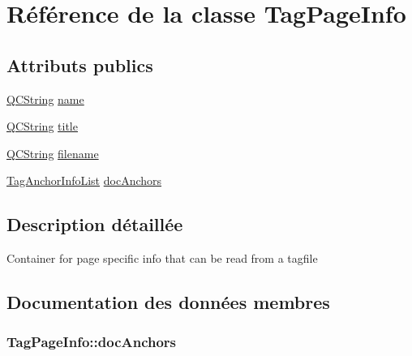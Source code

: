 \hypertarget{class_tag_page_info}{}\section{Référence de la classe Tag\+Page\+Info}
\label{class_tag_page_info}
\subsection*{Attributs publics}
\begin{DoxyCompactItemize}
\item 
\hyperlink{class_q_c_string}{Q\+C\+String} \hyperlink{class_tag_page_info_a2e57641a6ce6bd580af7e2b432ed7ca5}{name}
\item 
\hyperlink{class_q_c_string}{Q\+C\+String} \hyperlink{class_tag_page_info_a81c788a940f2a63663938bb5d4339062}{title}
\item 
\hyperlink{class_q_c_string}{Q\+C\+String} \hyperlink{class_tag_page_info_a3bf13922e2f0a86a2e23c3ccb72c84df}{filename}
\item 
\hyperlink{class_tag_anchor_info_list}{Tag\+Anchor\+Info\+List} \hyperlink{class_tag_page_info_a21505de00d345602f629498230a82722}{doc\+Anchors}
\end{DoxyCompactItemize}


\subsection{Description détaillée}
Container for page specific info that can be read from a tagfile 

\subsection{Documentation des données membres}
\hypertarget{class_tag_page_info_a21505de00d345602f629498230a82722}{}
\subsubsection[{doc\+Anchors}]{ Tag\+Page\+Info\+::doc\+Anchors}\label{class_tag_page_info_a21505de00d345602f629498230a82722}
\hypertarget{class_tag_page_info_a3bf13922e2f0a86a2e23c3ccb72c84df}{}

